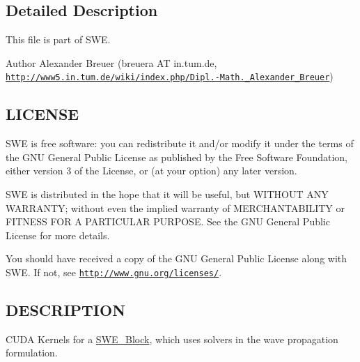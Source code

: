 \subsection{Detailed Description}
This file is part of S\-W\-E.

\begin{DoxyAuthor}{Author}
Alexander Breuer (breuera A\-T in.\-tum.\-de, \href{http://www5.in.tum.de/wiki/index.php/Dipl.-Math._Alexander_Breuer}{\tt http\-://www5.\-in.\-tum.\-de/wiki/index.\-php/\-Dipl.-\/\-Math.\-\_\-\-Alexander\-\_\-\-Breuer})
\end{DoxyAuthor}
\hypertarget{Writer_8hh_LICENSE}{}\subsection{L\-I\-C\-E\-N\-S\-E}\label{Writer_8hh_LICENSE}
S\-W\-E is free software\-: you can redistribute it and/or modify it under the terms of the G\-N\-U General Public License as published by the Free Software Foundation, either version 3 of the License, or (at your option) any later version.

S\-W\-E is distributed in the hope that it will be useful, but W\-I\-T\-H\-O\-U\-T A\-N\-Y W\-A\-R\-R\-A\-N\-T\-Y; without even the implied warranty of M\-E\-R\-C\-H\-A\-N\-T\-A\-B\-I\-L\-I\-T\-Y or F\-I\-T\-N\-E\-S\-S F\-O\-R A P\-A\-R\-T\-I\-C\-U\-L\-A\-R P\-U\-R\-P\-O\-S\-E. See the G\-N\-U General Public License for more details.

You should have received a copy of the G\-N\-U General Public License along with S\-W\-E. If not, see \href{http://www.gnu.org/licenses/}{\tt http\-://www.\-gnu.\-org/licenses/}.\hypertarget{NetCdfWriter_8hh_DESCRIPTION}{}\subsection{D\-E\-S\-C\-R\-I\-P\-T\-I\-O\-N}\label{NetCdfWriter_8hh_DESCRIPTION}
C\-U\-D\-A Kernels for a \hyperlink{classSWE__Block}{S\-W\-E\-\_\-\-Block}, which uses solvers in the wave propagation formulation. 

